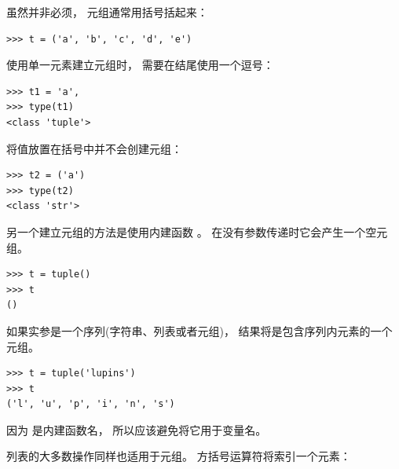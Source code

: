 虽然并非必须， 元组通常用括号括起来：


\begin{lstlisting}
>>> t = ('a', 'b', 'c', 'd', 'e')
\end{lstlisting}
%

使用单一元素建立元组时， 需要在结尾使用一个逗号：


\begin{lstlisting}
>>> t1 = 'a',
>>> type(t1)
<class 'tuple'>
\end{lstlisting}
%

将值放置在括号中并不会创建元组：

\begin{lstlisting}
>>> t2 = ('a')
>>> type(t2)
<class 'str'>
\end{lstlisting}
%

另一个建立元组的方法是使用内建函数 。
在没有参数传递时它会产生一个空元组。

\begin{lstlisting}
>>> t = tuple()
>>> t
()
\end{lstlisting}

%

如果实参是一个序列(字符串、列表或者元组)， 结果将是包含序列内元素的一个元组。

\begin{lstlisting}
>>> t = tuple('lupins')
>>> t
('l', 'u', 'p', 'i', 'n', 's')
\end{lstlisting}
%

因为  是内建函数名， 所以应该避免将它用于变量名。



列表的大多数操作同样也适用于元组。  方括号运算符将索引一个元素：


